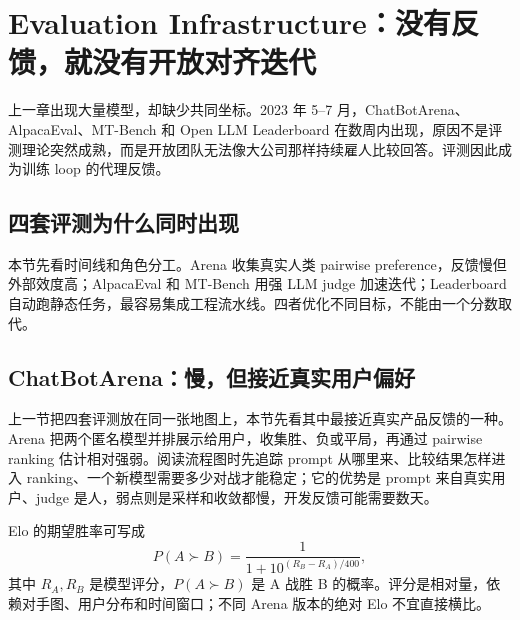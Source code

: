 \section{Evaluation Infrastructure：没有反馈，就没有开放对齐迭代}

上一章出现大量模型，却缺少共同坐标。2023 年 5--7 月，ChatBotArena、AlpacaEval、MT-Bench 和 Open LLM Leaderboard 在数周内出现，原因不是评测理论突然成熟，而是开放团队无法像大公司那样持续雇人比较回答。评测因此成为训练 loop 的代理反馈。

\subsection{四套评测为什么同时出现}

本节先看时间线和角色分工。Arena 收集真实人类 pairwise preference，反馈慢但外部效度高；AlpacaEval 和 MT-Bench 用强 LLM judge 加速迭代；Leaderboard 自动跑静态任务，最容易集成工程流水线。四者优化不同目标，不能由一个分数取代。



\subsection{ChatBotArena：慢，但接近真实用户偏好}

上一节把四套评测放在同一张地图上，本节先看其中最接近真实产品反馈的一种。Arena 把两个匿名模型并排展示给用户，收集胜、负或平局，再通过 pairwise ranking 估计相对强弱。阅读流程图时先追踪 prompt 从哪里来、比较结果怎样进入 ranking、一个新模型需要多少对战才能稳定；它的优势是 prompt 来自真实用户、judge 是人，弱点则是采样和收敛都慢，开发反馈可能需要数天。


Elo 的期望胜率可写成
\[
P(A\succ B)=\frac{1}{1+10^{(R_B-R_A)/400}},
\]
其中 $R_A,R_B$ 是模型评分，$P(A\succ B)$ 是 A 战胜 B 的概率。评分是相对量，依赖对手图、用户分布和时间窗口；不同 Arena 版本的绝对 Elo 不宜直接横比。


